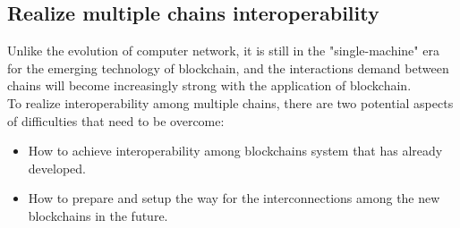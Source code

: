 \subsection{Realize multiple chains interoperability}

\noindent Unlike the evolution of computer network, it is still in the "single-machine" era for the emerging technology of blockchain, and the interactions demand between chains will become increasingly strong with the application of blockchain.\\
\noindent To realize interoperability among multiple chains, there are two potential aspects of difficulties that need to be overcome: 
\begin{itemize}
    \item How to achieve interoperability among blockchains system that has already developed.
    \item How to prepare and setup the way for the interconnections among the new blockchains in the future.
\end{itemize}

